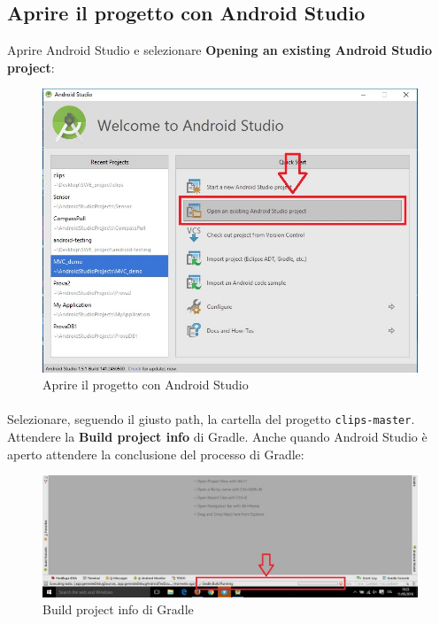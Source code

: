 \documentclass[../ManualeSviluppatore.tex]{subfiles}
\begin{document}
			
		
	\newpage	
	\subsection{Aprire il progetto con Android Studio}
		Aprire Android Studio e selezionare \textbf{Opening an existing Android Studio project}:
		
		\begin{figure} [h]
			\centering
			\includegraphics[scale=0.5]{img/AprireProgetto}
			\caption{Aprire il progetto con Android Studio}
			\label{fig:AprireProgetto}
		\end{figure}
		
		\paragraph*{}
			Selezionare, seguendo il giusto path, la cartella del progetto \verb|clips-master|. Attendere la \textbf{Build project info} di Gradle. Anche quando Android Studio è aperto attendere la conclusione del processo di Gradle:
			
		\begin{figure} [h]
			\centering
			\includegraphics[width=\textwidth]{img/BuildGradleCut}
			\caption{Build project info di Gradle}
			\label{fig:BuildGradleCut}
		\end{figure}
		
\end{document}
